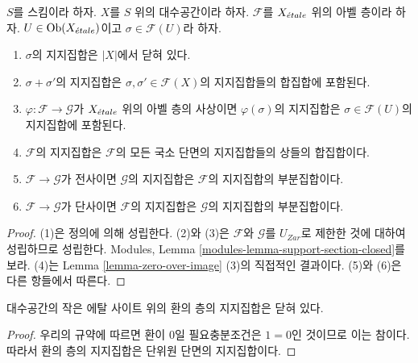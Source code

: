 \begin{lemma}
\label{lemma-support-section-closed}
$S$를 스킴이라 하자.
$X$를 $S$ 위의 대수공간이라 하자.
$\mathcal{F}$를 $X_{\acute{e}tale}$ 위의 아벨 층이라 하자.
$U \in \mathop{\mathrm{Ob}}\nolimits(X_{\acute{e}tale})$이고 $\sigma \in \mathcal{F}(U)$라 하자.
\begin{enumerate}
\item
$\sigma$의 지지집합은 $|X|$에서 닫혀 있다.
\item
$\sigma + \sigma'$의 지지집합은
$\sigma, \sigma' \in \mathcal{F}(X)$의 지지집합들의 합집합에 포함된다.
\item $\varphi : \mathcal{F} \to \mathcal{G}$가 $X_{\acute{e}tale}$ 위의
아벨 층의 사상이면 $\varphi(\sigma)$의 지지집합은
$\sigma \in \mathcal{F}(U)$의 지지집합에 포함된다.
\item $\mathcal{F}$의 지지집합은 $\mathcal{F}$의 모든 국소 단면의
지지집합들의 상들의 합집합이다.
\item $\mathcal{F} \to \mathcal{G}$가 전사이면
$\mathcal{G}$의 지지집합은 $\mathcal{F}$의 지지집합의 부분집합이다.
\item $\mathcal{F} \to \mathcal{G}$가 단사이면
$\mathcal{F}$의 지지집합은 $\mathcal{G}$의 지지집합의 부분집합이다.
\end{enumerate}
\end{lemma}

\begin{proof}
(1)은 정의에 의해 성립한다.
(2)와 (3)은 $\mathcal{F}$와 $\mathcal{G}$를 $U_{Zar}$로 제한한 것에
대하여 성립하므로 성립한다. Modules, Lemma
\ref{modules-lemma-support-section-closed}를 보라.
(4)는 Lemma \ref{lemma-zero-over-image} (3)의 직접적인 결과이다.
(5)와 (6)은 다른 항들에서 따른다.
\end{proof}

\begin{lemma}
\label{lemma-support-sheaf-rings-closed}
대수공간의 작은 에탈 사이트 위의 환의 층의 지지집합은 닫혀 있다.
\end{lemma}

\begin{proof}
우리의 규약에 따르면 환이 $0$일 필요충분조건은 $1 = 0$인 것이므로
이는 참이다. 따라서 환의 층의 지지집합은 단위원 단면의 지지집합이다.
\end{proof}






